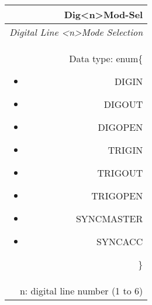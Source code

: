\documentclass[openany]{article}
\begin{document}
		\begin{tabular}{N}
			\hline
			\bfseries Dig{\textless n\textgreater}Mod-Sel\label{pv:digmod-sel} \\ \hline
			\emph{Digital Line \textless n\textgreater Mode Selection} \\
			Data type: enum\{\begin{itemize}[noitemsep]
				\small
				\item[] DIGIN
				\item[] DIGOUT
				\item[] DIGOPEN
				\item[] TRIGIN
				\item[] TRIGOUT
				\item[] TRIGOPEN
				\item[] SYNCMASTER
				\item[] SYNCACC
			\end{itemize}\} \\
			n: digital line number (1 to 6) \\

\end{tabular}
\end{document}
